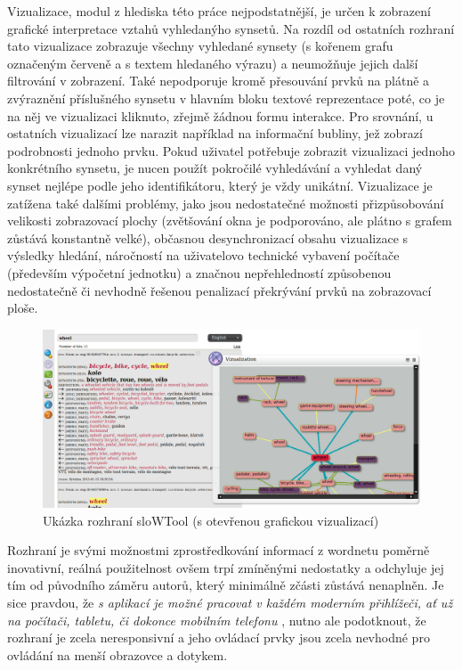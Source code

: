 \documentclass[a4paper, 11pt, oneside]{book}
\begin{document}
				Vizualizace, modul z hlediska této práce nejpodstatnější, je určen k zobrazení grafické interpretace vztahů vyhledanýho synsetů. Na rozdíl od ostatních rozhraní tato vizualizace zobrazuje všechny vyhledané synsety (s kořenem grafu označeným červeně a s textem hledaného výrazu) a neumožňuje jejich další filtrování v zobrazení. Také nepodporuje kromě přesouvání prvků na plátně a zvýraznění příslušného synsetu v hlavním bloku textové reprezentace poté, co je na něj ve vizualizaci kliknuto, zřejmě žádnou formu interakce. Pro srovnání, u ostatních vizualizací lze narazit například na informační bubliny, jež zobrazí podrobnosti jednoho prvku. Pokud uživatel potřebuje zobrazit vizualizaci jednoho konkrétního synsetu, je nucen použít pokročilé vyhledávání a vyhledat daný synset nejlépe podle jeho identifikátoru, který je vždy unikátní. Vizualizace je zatížena také dalšími problémy, jako jsou nedostatečné možnosti přizpůsobování velikosti zobrazovací plochy (zvětšování okna je podporováno, ale plátno s grafem zůstává konstantně velké), občasnou desynchronizací obsahu vizualizace s výsledky hledání, náročností na uživatelovo technické vybavení počítače (především výpočetní jednotku) a značnou nepřehledností způsobenou nedostatečně či nevhodně řešenou penalizací překrývání prvků na zobrazovací ploše. 

				\begin{figure}[h]
					\centering
					\includegraphics[width=1.0\textwidth]{slowtool.png}
					\caption{Ukázka rozhraní sloWTool (s otevřenou grafickou vizualizací)}
					\label{fig:slowtool}
				\end{figure}

				Rozhraní je svými možnostmi zprostředkování informací z wordnetu poměrně inovativní, reálná použitelnost ovšem trpí zmíněnými nedostatky a odchyluje jej tím od původního záměru autorů, který minimálně zčásti zůstává nenaplněn. Je sice pravdou, že \textit{s aplikací je možné pracovat v každém moderním přihlížeči, ať už na počítači, tabletu, či dokonce mobilním telefonu} \parencite{fivser2011visualizing}, nutno ale podotknout, že rozhraní je zcela neresponsivní a jeho ovládací prvky jsou zcela nevhodné pro ovládání na menší obrazovce a dotykem.
\end{document}
